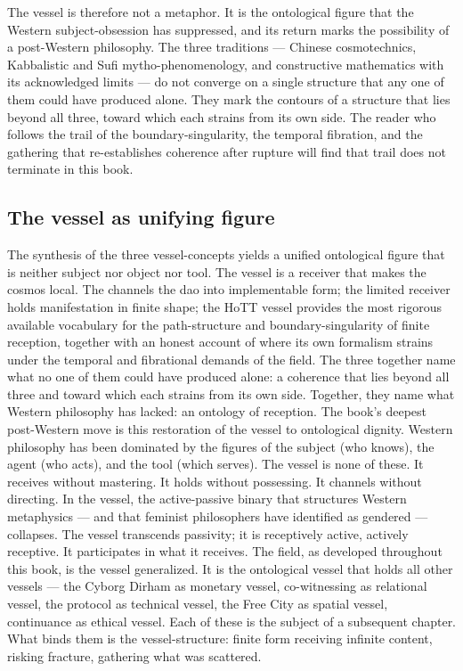The vessel is therefore not a metaphor. It is the ontological figure that the Western subject-obsession has suppressed, and its return marks the possibility of a post-Western philosophy. The three traditions --- Chinese cosmotechnics, Kabbalistic and Sufi mytho-phenomenology, and constructive mathematics with its acknowledged limits --- do not converge on a single structure that any one of them could have produced alone. They mark the contours of a structure that lies beyond all three, toward which each strains from its own side. The reader who follows the trail of the boundary-singularity, the temporal fibration, and the gathering that re-establishes coherence after rupture will find that trail does not terminate in this book.

\subsection{The vessel as unifying figure}

The synthesis of the three vessel-concepts yields a unified ontological figure that is neither subject nor object nor tool. The vessel is a receiver that makes the cosmos local. The  channels the dao into implementable form; the limited receiver holds manifestation in finite shape; the HoTT vessel provides the most rigorous available vocabulary for the path-structure and boundary-singularity of finite reception, together with an honest account of where its own formalism strains under the temporal and fibrational demands of the field. The three together name what no one of them could have produced alone: a coherence that lies beyond all three and toward which each strains from its own side. Together, they name what Western philosophy has lacked: an ontology of reception. The book’s deepest post-Western move is this restoration of the vessel to ontological dignity. Western philosophy has been dominated by the figures of the subject (who knows), the agent (who acts), and the tool (which serves). The vessel is none of these. It receives without mastering. It holds without possessing. It channels without directing. In the vessel, the active-passive binary that structures Western metaphysics — and that feminist philosophers have identified as gendered — collapses. The vessel transcends passivity; it is receptively active, actively receptive. It participates in what it receives. The field, as developed throughout this book, is the vessel generalized. It is the ontological vessel that holds all other vessels — the Cyborg Dirham as monetary vessel, co-witnessing as relational vessel, the  protocol as technical vessel, the Free City as spatial vessel, continuance as ethical vessel. Each of these is the subject of a subsequent chapter. What binds them is the vessel-structure: finite form receiving infinite content, risking fracture, gathering what was scattered.

